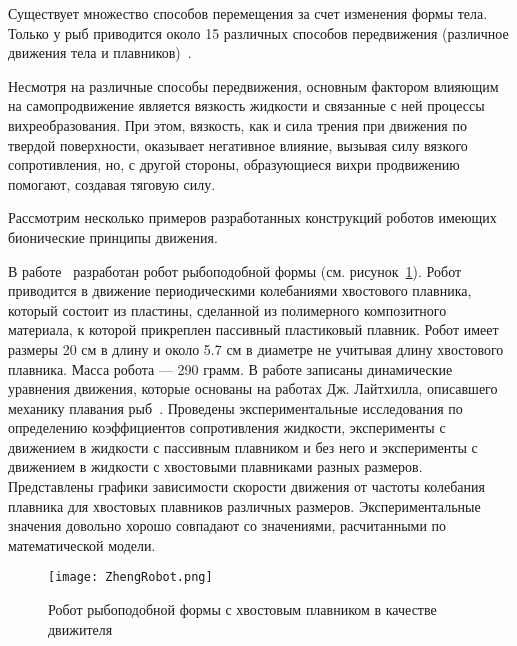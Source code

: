 Существует множество способов перемещения за счет изменения формы тела. Только у рыб приводится около 15 различных способов передвижения (различное движения тела и плавников)~\cite{Blake_1983}.

Несмотря на различные способы передвижения, основным фактором влияющим на самопродвижение является вязкость жидкости и связанные с ней процессы вихреобразования. При этом, вязкость, как и сила трения при движения по твердой поверхности, оказывает негативное влияние, вызывая силу вязкого сопротивления, но, с другой стороны, образующиеся вихри продвижению помогают, создавая тяговую силу.

Рассмотрим несколько примеров разработанных конструкций роботов имеющих бионические принципы движения.

В работе~\cite{Zheng_2010} разработан робот рыбоподобной формы (см. рисунок~\ref{ZhengRobot}). Робот приводится в движение периодическими колебаниями хвостового плавника, который состоит из пластины, сделанной из полимерного композитного материала, к которой прикреплен пассивный пластиковый плавник. Робот имеет размеры 20 см в длину и около 5.7 см в диаметре не учитывая длину хвостового плавника. Масса робота --- 290 грамм. В работе записаны динамические уравнения движения, которые основаны на работах Дж. Лайтхилла, описавшего механику плавания рыб~\cite{Lighthill_1970}. Проведены экспериментальные исследования по определению коэффициентов сопротивления жидкости, эксперименты с движением в жидкости с пассивным плавником и без него и эксперименты с движением в жидкости с хвостовыми плавниками разных размеров. Представлены графики зависимости скорости движения от частоты колебания плавника для хвостовых плавников различных размеров. Экспериментальные значения довольно хорошо совпадают со значениями, расчитанными по математической модели.

\begin{figure}[h]
	\centering
	\texttt{[image: ZhengRobot.png]}%
	\caption{Робот рыбоподобной формы с хвостовым плавником в качестве движителя}
	\label{ZhengRobot}
\end{figure}

